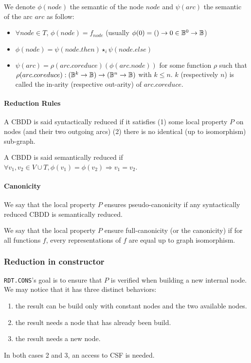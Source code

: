 \documentclass[a4paper,10pt]{article}
\begin{document}
We denote $\phi(node)$ the semantic of the node $node$ and $\psi(arc)$ the semantic of the arc $arc$ as follow:\begin{itemize}
\item $\forall node\in T$, $\phi(node) = f_{node}$ (usually $\phi(0) = () \rightarrow 0 \in \mathbb{B}^0 \rightarrow \mathbb{B}$)
\item $\phi(node) = \psi(node.then)\star_i\psi(node.else)$
\item $\psi(arc) = \rho(arc.coreduce)(\phi(arc.node))$ for some function $\rho$ such that $\rho(arc.coreduce) : (\mathbb{B}^k \rightarrow \mathbb{B}) \rightarrow (\mathbb{B}^n \rightarrow \mathbb{B})$ with $k\leq n$. $k$ (respectively $n$) is called the in-arity (respective out-arity) of $arc.coreduce$.
\end{itemize}

\paragraph{Reduction Rules}

A CBDD is said syntactically reduced if it satisfies (1) some local property $P$ on nodes (and their two outgoing arcs) (2) there is no identical (up to isomorphism) sub-graph.


A CBDD is said semantically reduced if $\forall v_1, v_2 \in V\cup T, \phi(v_1)=\phi(v_2) \Rightarrow v_1 = v_2$.

\paragraph{Canonicity}


We say that the local property $P$ ensures pseudo-canonicity if any syntactically reduced CBDD is semantically reduced.


We say that the local property $P$ ensure full-canonicity (or the canonicity) if for all functions $f$, every representations of $f$ are equal up to graph isomorphism.


\subsubsection{Reduction in constructor}

\texttt{RDT.CONS}'s goal is to ensure that $P$ is verified when building a new internal node.
We may notice that it has three distinct behaviors:\begin{enumerate}
  \item the result can be build only with constant nodes and the two available nodes.
  \item the result needs a node that has already been build.
  \item the result needs a new node.
\end{enumerate}
In both cases 2 and 3, an access to CSF is needed.
\end{document}
